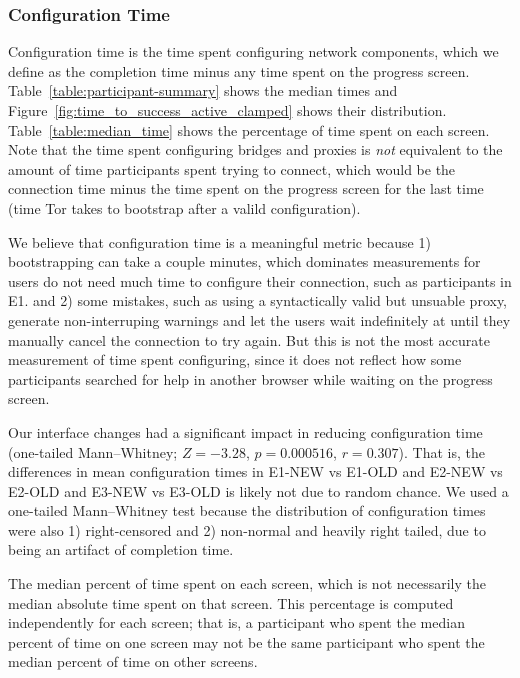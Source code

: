 \documentclass[USenglish,oneside,twocolumn]{article}
\begin{document}
\subsubsection{Configuration Time} 
Configuration time is the time spent configuring network components, which we define as the completion time minus any time spent on the progress screen. Table~\ref{table:participant-summary} shows the median times and Figure~\ref{fig:time_to_success_active_clamped} shows their distribution. Table~\ref{table:median_time} shows the percentage of time spent on each screen. Note that the time spent configuring bridges and proxies is {\it not} equivalent to the amount of time participants spent trying to connect, which would be the connection time minus the time spent on the progress screen for the last time (time Tor takes to bootstrap after a valild configuration). 

We believe that configuration time is a meaningful metric because 1) bootstrapping can take a couple minutes, which dominates measurements for users do not need much time to configure their connection, such as participants in E1. and 2) some mistakes, such as using a syntactically valid but unsuable proxy, generate non-interruping warnings and let the users wait indefinitely at until they manually cancel the connection to try again. But this is not the most accurate measurement of time spent configuring, since it does not reflect how some participants searched for help in another browser while waiting on the progress screen.

Our interface changes had a significant impact in reducing configuration time (one-tailed Mann--Whitney; $Z = -3.28$, $p = 0.000516$, $r = 0.307$). That is, the differences in mean configuration times in E1-NEW vs E1-OLD and E2-NEW vs E2-OLD and E3-NEW vs E3-OLD is likely not due to random chance. We used a one-tailed Mann--Whitney test because the distribution of configuration times were also 1) right-censored and 2) non-normal and heavily right tailed, due to being an artifact of completion time. 

\begin{table}[t]
\centering

\caption{The median percent of time spent on each screen, which is not
necessarily the median absolute time spent on that screen. 
This percentage is computed independently for each screen; that is, a participant who spent the median percent 
of time on one screen may not be the same participant who spent the median percent
of time on other screens.} 
\label{table:median_time}
\end{table}
\end{document}
